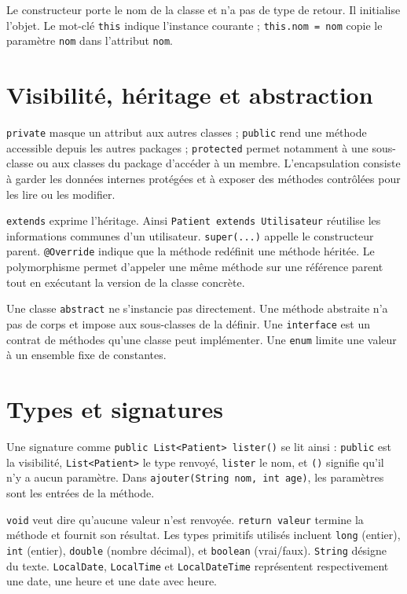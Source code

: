 \documentclass[11pt,a4paper]{report}
\begin{document}
Le constructeur porte le nom de la classe et n'a pas de type de retour. Il initialise l'objet. Le mot-clé \texttt{this} indique l'instance courante ; \texttt{this.nom = nom} copie le paramètre \texttt{nom} dans l'attribut \texttt{nom}.

\section{Visibilité, héritage et abstraction}
\texttt{private} masque un attribut aux autres classes ; \texttt{public} rend une méthode accessible depuis les autres packages ; \texttt{protected} permet notamment à une sous-classe ou aux classes du package d'accéder à un membre. L'encapsulation consiste à garder les données internes protégées et à exposer des méthodes contrôlées pour les lire ou les modifier.

\texttt{extends} exprime l'héritage. Ainsi \texttt{Patient extends Utilisateur} réutilise les informations communes d'un utilisateur. \texttt{super(...)} appelle le constructeur parent. \texttt{@Override} indique que la méthode redéfinit une méthode héritée. Le polymorphisme permet d'appeler une même méthode sur une référence parent tout en exécutant la version de la classe concrète.

Une classe \texttt{abstract} ne s'instancie pas directement. Une méthode abstraite n'a pas de corps et impose aux sous-classes de la définir. Une \texttt{interface} est un contrat de méthodes qu'une classe peut implémenter. Une \texttt{enum} limite une valeur à un ensemble fixe de constantes.

\section{Types et signatures}
Une signature comme \texttt{public List<Patient> lister()} se lit ainsi : \texttt{public} est la visibilité, \texttt{List<Patient>} le type renvoyé, \texttt{lister} le nom, et \texttt{()} signifie qu'il n'y a aucun paramètre. Dans \texttt{ajouter(String nom, int age)}, les paramètres sont les entrées de la méthode.

\texttt{void} veut dire qu'aucune valeur n'est renvoyée. \texttt{return valeur} termine la méthode et fournit son résultat. Les types primitifs utilisés incluent \texttt{long} (entier), \texttt{int} (entier), \texttt{double} (nombre décimal), et \texttt{boolean} (vrai/faux). \texttt{String} désigne du texte. \texttt{LocalDate}, \texttt{LocalTime} et \texttt{LocalDateTime} représentent respectivement une date, une heure et une date avec heure.
\end{document}
